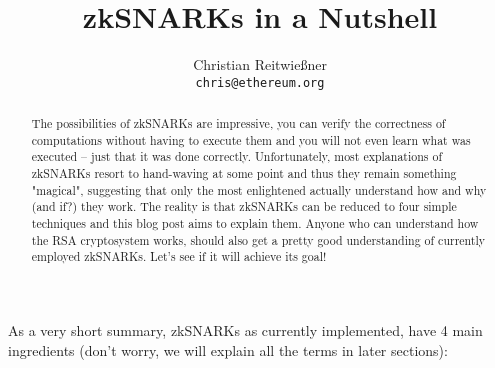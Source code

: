 \documentclass[11pt,letterpaper]{article}
\date{}
\begin{document}


\title{zkSNARKs in a Nutshell}

\author{Christian Reitwießner \\ 
{\tt chris@ethereum.org}}


\maketitle


\begin{abstract}
\noindent The possibilities of zkSNARKs are impressive, you can verify the correctness of computations without having to execute them and you will not even learn what was executed – just that it was done correctly. Unfortunately, most explanations of zkSNARKs resort to hand-waving at some point and thus they remain something "magical", suggesting that only the most enlightened actually understand how and why (and if?) they work. The reality is that zkSNARKs can be reduced to four simple techniques and this blog post aims to explain them. Anyone who can understand how the RSA cryptosystem works, should also get a pretty good understanding of currently employed zkSNARKs. Let’s see if it will achieve its goal!
\end{abstract}


As a very short summary, zkSNARKs as currently implemented, have 4 main ingredients (don’t worry, we will explain all the terms in later sections):
\end{document}

